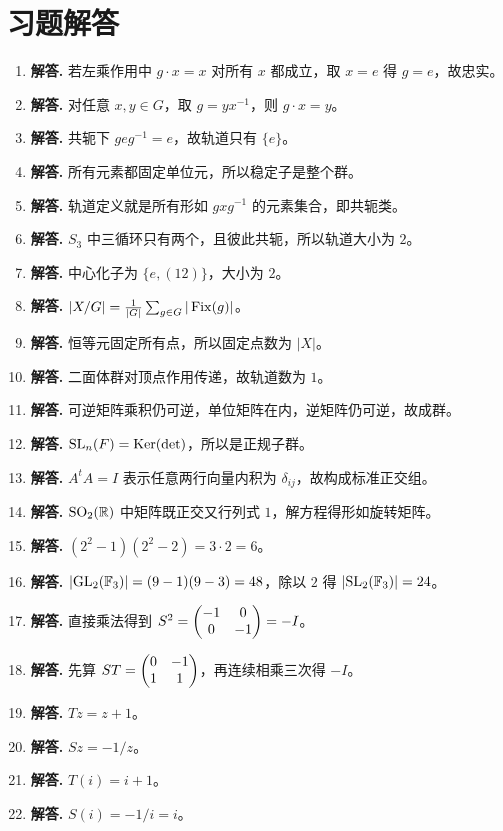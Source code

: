 \section*{习题解答}
\begin{enumerate}[label=\textbf{\arabic*.}, leftmargin=*, itemsep=1em]
\item \textbf{解答.} 若左乘作用中 $g\cdot x=x$ 对所有 $x$ 都成立，取 $x=e$ 得 $g=e$，故忠实。
\item \textbf{解答.} 对任意 $x,y\in G$，取 $g=yx^{-1}$，则 $g\cdot x=y$。
\item \textbf{解答.} 共轭下 $geg^{-1}=e$，故轨道只有 $\{e\}$。
\item \textbf{解答.} 所有元素都固定单位元，所以稳定子是整个群。
\item \textbf{解答.} 轨道定义就是所有形如 $gxg^{-1}$ 的元素集合，即共轭类。
\item \textbf{解答.} $S_3$ 中三循环只有两个，且彼此共轭，所以轨道大小为 $2$。
\item \textbf{解答.} 中心化子为 $\{e,(12)\}$，大小为 $2$。
\item \textbf{解答.} $|X/G|=\frac1{|G|}\sum_{g\in G}|\operatorname{Fix}(g)|$。
\item \textbf{解答.} 恒等元固定所有点，所以固定点数为 $|X|$。
\item \textbf{解答.} 二面体群对顶点作用传递，故轨道数为 $1$。
\item \textbf{解答.} 可逆矩阵乘积仍可逆，单位矩阵在内，逆矩阵仍可逆，故成群。
\item \textbf{解答.} $\mathrm{SL}_n(F)=\mathrm{Ker}(\det)$，所以是正规子群。
\item \textbf{解答.} $A^tA=I$ 表示任意两行向量内积为 $\delta_{ij}$，故构成标准正交组。
\item \textbf{解答.} $\mathrm{SO}_2(\mathbb{R})$ 中矩阵既正交又行列式 $1$，解方程得形如旋转矩阵。
\item \textbf{解答.} $(2^2-1)(2^2-2)=3\cdot2=6$。
\item \textbf{解答.} $|\mathrm{GL}_2(\mathbb{F}_3)|=(9-1)(9-3)=48$，除以 $2$ 得 $|\mathrm{SL}_2(\mathbb{F}_3)|=24$。
\item \textbf{解答.} 直接乘法得到 $S^2=\begin{pmatrix} -1&0\\0&-1 \end{pmatrix}=-I$。
\item \textbf{解答.} 先算 $ST=\begin{pmatrix} 0&-1\\1&1 \end{pmatrix}$，再连续相乘三次得 $-I$。
\item \textbf{解答.} $Tz=z+1$。
\item \textbf{解答.} $Sz=-1/z$。
\item \textbf{解答.} $T(i)=i+1$。
\item \textbf{解答.} $S(i)=-1/i=i$。

\end{enumerate}
